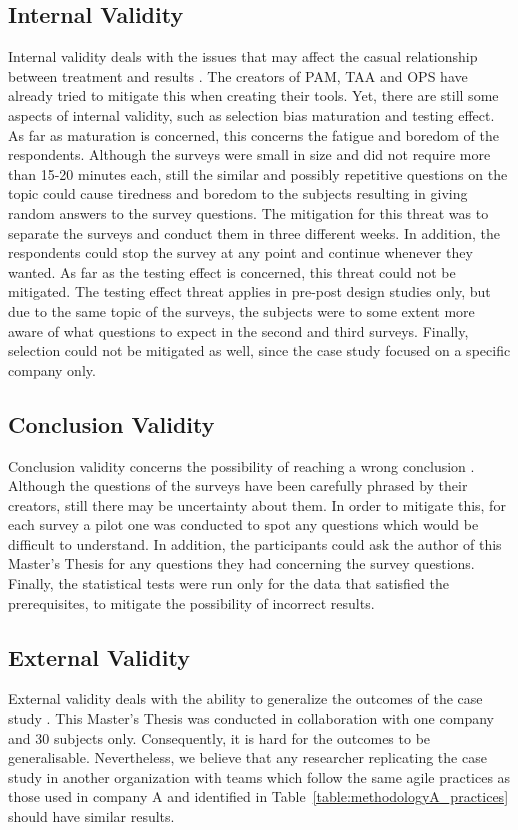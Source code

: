 \subsection{Internal Validity}
Internal validity deals with the issues that may affect the casual relationship between treatment and results \cite{Wohlin}. The creators of \ac{PAM}, \ac{TAA} and \ac{OPS} have already tried to mitigate this when creating their tools. Yet, there are still some aspects of internal validity, such as selection bias maturation and testing effect. As far as maturation is concerned, this concerns the fatigue and boredom of the respondents. Although the surveys were small in size and did not require more than 15-20 minutes each, still the similar and possibly repetitive questions on the topic could cause tiredness and boredom to the subjects resulting in giving random answers to the survey questions. The mitigation for this threat was to separate the surveys and conduct them in three different weeks. In addition, the respondents could stop the survey at any point and continue whenever they wanted. As far as the testing effect is concerned, this threat could not be mitigated. The testing effect threat applies in pre-post design studies only, but due to the same topic of the surveys, the subjects were to some extent more aware of what questions to expect in the second and third surveys. Finally, selection could not be mitigated as well, since the case study focused on a specific company only.

\subsection{Conclusion Validity}
Conclusion validity concerns the possibility of reaching a wrong conclusion \cite{Wohlin}. Although the questions of the surveys have been carefully phrased by their creators, still there may be uncertainty about them. In order to mitigate this, for each survey a pilot one was conducted to spot any questions which would be difficult to understand. In addition, the participants could ask the author of this Master's Thesis for any questions they had concerning the survey questions. Finally, the statistical tests were run only for the data that satisfied the prerequisites, to mitigate the possibility of incorrect results. %

\subsection{External Validity}
External validity deals with the ability to generalize the outcomes of the case study \cite{Wohlin}. This Master's Thesis was conducted in collaboration with one company and 30 subjects only. Consequently, it is hard for the outcomes to be generalisable. Nevertheless, we believe that any researcher replicating the case study in another organization with teams which follow the same agile practices as those used in company A and identified in Table~\ref{table:methodologyA_practices} should have similar results.

